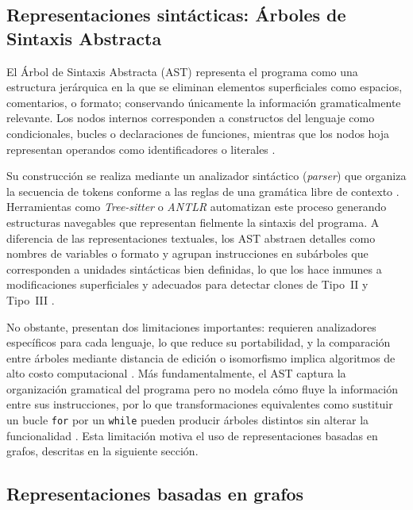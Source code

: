 \subsection{Representaciones sintácticas: Árboles de Sintaxis Abstracta}

El Árbol de Sintaxis Abstracta (AST) representa el programa como una 
estructura jerárquica en la que se eliminan elementos superficiales como espacios, comentarios, o formato; conservando únicamente la información 
gramaticalmente relevante. Los nodos internos corresponden a constructos 
del lenguaje como condicionales, bucles o declaraciones de funciones, 
mientras que los nodos hoja representan operandos como identificadores 
o literales \cite{Roy2007Survey, Bogomolov2021Authorship}.

Su construcción se realiza mediante un analizador sintáctico 
(\textit{parser}) que organiza la secuencia de tokens conforme a las 
reglas de una gramática libre de contexto \cite{Song2024AST}. 
Herramientas como \textit{Tree-sitter} o \textit{ANTLR} automatizan 
este proceso generando estructuras navegables que representan fielmente 
la sintaxis del programa. A diferencia de las representaciones textuales, 
los AST abstraen detalles como nombres de variables o formato y agrupan 
instrucciones en subárboles que corresponden a unidades sintácticas bien 
definidas, lo que los hace inmunes a modificaciones superficiales y 
adecuados para detectar clones de Tipo~II y Tipo~III 
\cite{Roy2007Survey, Pradeep2025AntiPlagiarism}.

No obstante, presentan dos limitaciones importantes: requieren 
analizadores específicos para cada lenguaje, lo que reduce su 
portabilidad, y la comparación entre árboles mediante distancia de 
edición o isomorfismo implica algoritmos de alto costo computacional 
\cite{Roy2007Survey, Pradeep2025AntiPlagiarism}. Más 
fundamentalmente, el AST captura la organización gramatical del programa 
pero no modela cómo fluye la información entre sus instrucciones, por lo 
que transformaciones equivalentes como sustituir un bucle \texttt{for} 
por un \texttt{while} pueden producir árboles distintos sin alterar la 
funcionalidad \cite{Roy2007Survey}. Esta limitación motiva el uso de 
representaciones basadas en grafos, descritas en la siguiente sección.


\subsection{Representaciones basadas en grafos}

